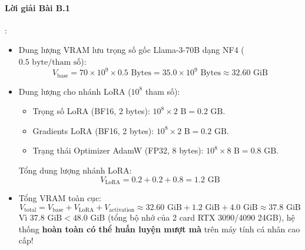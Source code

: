 \paragraph{Lời giải Bài B.1}:
\begin{itemize}
  \item[a)] Dung lượng VRAM lưu trọng số gốc Llama-3-70B dạng NF4 ($0.5\text{ byte/tham số}$):
  \begin{equation*}
  V_{\text{base}} = 70 \times 10^9 \times 0.5\text{ Bytes} = 35.0 \times 10^9\text{ Bytes} \approx 32.60\text{ GiB}
  \end{equation*}

  \item[b)] Dung lượng cho nhánh LoRA ($10^8$ tham số):
  \begin{itemize}
    \item Trọng số LoRA (BF16, 2 bytes): $10^8 \times 2\text{ B} = 0.2\text{ GB}$.
    \item Gradients LoRA (BF16, 2 bytes): $10^8 \times 2\text{ B} = 0.2\text{ GB}$.
    \item Trạng thái Optimizer AdamW (FP32, 8 bytes): $10^8 \times 8\text{ B} = 0.8\text{ GB}$.
  \end{itemize}
  Tổng dung lượng nhánh LoRA:
  \begin{equation*}
  V_{\text{LoRA}} = 0.2 + 0.2 + 0.8 = 1.2\text{ GB}
  \end{equation*}

  \item[c)] Tổng VRAM toàn cục:
  \begin{equation*}
  V_{\text{total}} = V_{\text{base}} + V_{\text{LoRA}} + V_{\text{activation}} \approx 32.60\text{ GiB} + 1.2\text{ GiB} + 4.0\text{ GiB} \approx 37.8\text{ GiB}
  \end{equation*}
  Vì $37.8\text{ GiB} < 48.0\text{ GiB}$ (tổng bộ nhớ của 2 card RTX 3090/4090 24GB), hệ thống \textbf{hoàn toàn có thể huấn luyện mượt mà} trên máy tính cá nhân cao cấp!
\end{itemize}

